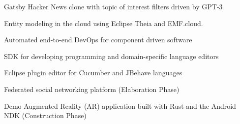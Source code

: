 
Gatsby Hacker News clone with topic of interest filters driven by GPT-3

\divider


Entity modeling in the cloud using Eclipse Theia and EMF.cloud.

\divider


Automated end-to-end DevOps for component driven software

\divider

SDK for developing programming and domain-specific language editors

\divider

Eclipse plugin editor for Cucumber and JBehave languages

\divider

Federated social networking platform (Elaboration Phase) 

\divider

Demo Augmented Reality (AR) application built with Rust and the Android NDK (Construction Phase) 
